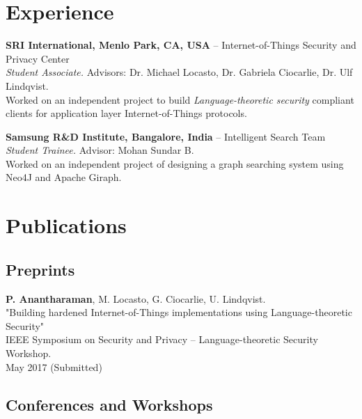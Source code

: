 \documentclass[letterpaper,10pt]{article}
\renewenvironment{itemize}{
  \begin{list}{}{
    \setlength{\leftmargin}{1.5em}
  }
}{
  \end{list}
}
\begin{document}
\section*{Experience}
\begin{itemize}
\setlength\itemsep{0ex}
\item \textbf{SRI International, Menlo Park, CA, USA} -- Internet-of-Things Security and Privacy Center\\
    \textit{Student Associate.} Advisors: Dr. Michael Locasto, Dr. Gabriela Ciocarlie, Dr. Ulf Lindqvist.\\
    Worked on an independent project to build \textit{Language-theoretic security} compliant clients for application layer Internet-of-Things protocols. 
\item \textbf{Samsung R\&D Institute, Bangalore, India} -- Intelligent Search Team\\
    \textit{Student Trainee.} Advisor: Mohan Sundar B.\\
    Worked on an independent project of designing a graph searching system using Neo4J and Apache Giraph.
\end{itemize}


\section*{Publications}


\subsection*{Preprints}
\begin{itemize}
    \item {\bf P. Anantharaman}, M. Locasto, G. Ciocarlie, U. Lindqvist.\\
        "Building hardened Internet-of-Things implementations using Language-theoretic Security"\\
        IEEE Symposium on Security and Privacy -- Language-theoretic Security Workshop.\\
        May 2017 (Submitted)
\end{itemize}

\subsection*{Conferences and Workshops} %
\end{document}
